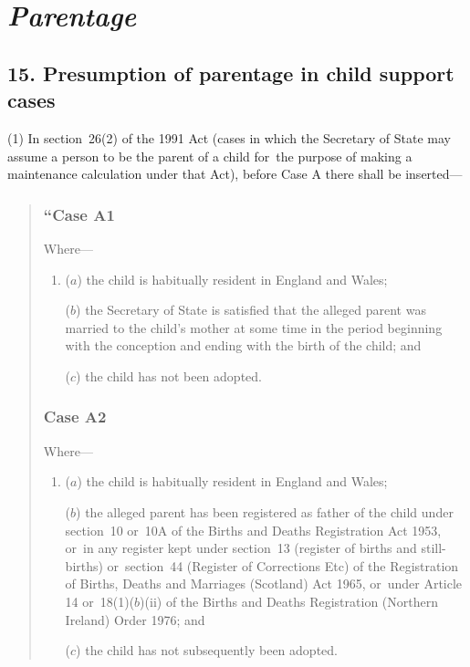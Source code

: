\documentclass[12pt,a4paper]{article}
\begin{document}
\section{\itshape Parentage}

\subsection{15. Presumption of parentage in child support cases}

(1) In section~26(2)  of the 1991 Act (cases in which the Secretary of State may assume a person to be the parent of a child for~the purpose of making a maintenance calculation under that Act), before Case A there shall be inserted—
\begin{quotation}
\subsubsection*{“Case A1}

Where—
\begin{enumerate}\item[]
($a$) the child is habitually resident in England and Wales;

($b$) the Secretary of State is satisfied that the alleged parent was married to the child’s mother at some time in the period beginning with the conception and ending with the birth of the child; and

($c$) the child has not been adopted.
\end{enumerate}

\subsubsection*{Case A2}

Where—
\begin{enumerate}\item[]
($a$) the child is habitually resident in England and Wales;

($b$) the alleged parent has been registered as father of the child under section~10 or~10A of the Births and Deaths Registration Act 1953, or~in any register kept under section~13 (register of births and still-births) or~section~44 (Register of Corrections Etc) of the Registration of Births, Deaths and Marriages (Scotland) Act 1965, or~under Article 14 or~18(1)($b$)(ii)  of the Births and Deaths Registration (Northern Ireland) Order 1976; and

($c$) the child has not subsequently been adopted.
\end{enumerate}


\end{quotation}
\end{document}
